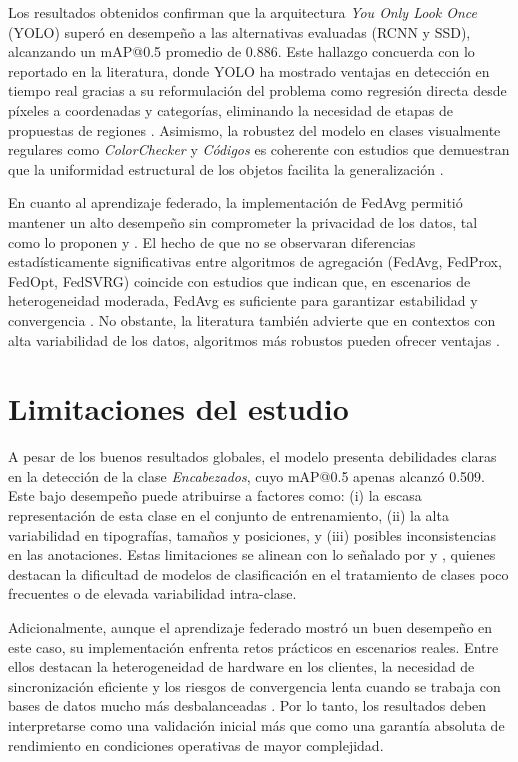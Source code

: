 Los resultados obtenidos confirman que la arquitectura \textit{You Only Look Once} (YOLO) \citep{Redmon2016} superó en desempeño a las alternativas evaluadas (RCNN y SSD), alcanzando un mAP@0.5 promedio de 0.886. Este hallazgo concuerda con lo reportado en la literatura, donde YOLO ha mostrado ventajas en detección en tiempo real gracias a su reformulación del problema como regresión directa desde píxeles a coordenadas y categorías, eliminando la necesidad de etapas de propuestas de regiones \citep{Ren2015, Simonyan2014}. Asimismo, la robustez del modelo en clases visualmente regulares como \textit{ColorChecker} y \textit{Códigos} es coherente con estudios que demuestran que la uniformidad estructural de los objetos facilita la generalización \citep{Goodfellow2016, powers2020evaluation}.

En cuanto al aprendizaje federado, la implementación de FedAvg permitió mantener un alto desempeño sin comprometer la privacidad de los datos, tal como lo proponen \citet{McMahan2017} y \citet{bonawitz2016practicalsecureaggregationfederated}. El hecho de que no se observaran diferencias estadísticamente significativas entre algoritmos de agregación (FedAvg, FedProx, FedOpt, FedSVRG) coincide con estudios que indican que, en escenarios de heterogeneidad moderada, FedAvg es suficiente para garantizar estabilidad y convergencia \citep{mansour2022federated, ghosh2020efficient}. No obstante, la literatura también advierte que en contextos con alta variabilidad de los datos, algoritmos más robustos pueden ofrecer ventajas \citep{blanchard2017machine, yin2018byzantine}.

\section{Limitaciones del estudio}

A pesar de los buenos resultados globales, el modelo presenta debilidades claras en la detección de la clase \textit{Encabezados}, cuyo mAP@0.5 apenas alcanzó 0.509. Este bajo desempeño puede atribuirse a factores como: (i) la escasa representación de esta clase en el conjunto de entrenamiento, (ii) la alta variabilidad en tipografías, tamaños y posiciones, y (iii) posibles inconsistencias en las anotaciones. Estas limitaciones se alinean con lo señalado por \citet{sokolova2009systematic} y \citet{huang2007loss}, quienes destacan la dificultad de modelos de clasificación en el tratamiento de clases poco frecuentes o de elevada variabilidad intra-clase.

Adicionalmente, aunque el aprendizaje federado mostró un buen desempeño en este caso, su implementación enfrenta retos prácticos en escenarios reales. Entre ellos destacan la heterogeneidad de hardware en los clientes, la necesidad de sincronización eficiente y los riesgos de convergencia lenta cuando se trabaja con bases de datos mucho más desbalanceadas \citep{reddi2020adaptive}. Por lo tanto, los resultados deben interpretarse como una validación inicial más que como una garantía absoluta de rendimiento en condiciones operativas de mayor complejidad.

